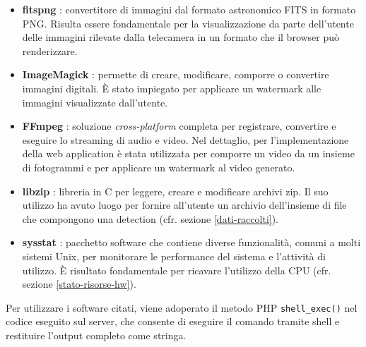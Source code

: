 \begin{itemize}

    \item \textbf{fitspng} \cite{fitspng}: convertitore di immagini dal formato astronomico FITS in formato PNG. Risulta essere fondamentale per la visualizzazione da parte dell'utente delle immagini rilevate dalla telecamera in un formato che il browser può renderizzare.
    
    \item \textbf{ImageMagick} \cite{ImageMagick}: permette di creare, modificare, comporre o convertire immagini digitali. È stato impiegato per applicare un watermark alle immagini visualizzate dall'utente.
    
    \item \textbf{FFmpeg} \cite{FFmpeg}: soluzione \emph{cross-platform} completa per registrare, convertire e eseguire lo streaming di audio e video. Nel dettaglio, per l'implementazione della web application è stata utilizzata per comporre un video da un insieme di fotogrammi e per applicare un watermark al video generato.
    
    \item \textbf{libzip} \cite{libzip}: libreria in C per leggere, creare e modificare archivi zip. Il suo utilizzo ha avuto luogo per fornire all'utente un archivio dell'insieme di file che compongono una detection (cfr. sezione \ref{dati-raccolti}).
    
    \item \textbf{sysstat} \cite{sysstat}: pacchetto software che contiene diverse funzionalità, comuni a molti sistemi Unix, per monitorare le performance del sistema e l'attività di utilizzo. È risultato fondamentale per ricavare l'utilizzo della CPU (cfr. sezione \ref{stato-risorse-hw}).

\end{itemize}

Per utilizzare i software citati, viene adoperato il metodo PHP \texttt{shell\_exec()} nel codice eseguito sul server, che consente di eseguire il comando tramite shell e restituire l'output completo come stringa.